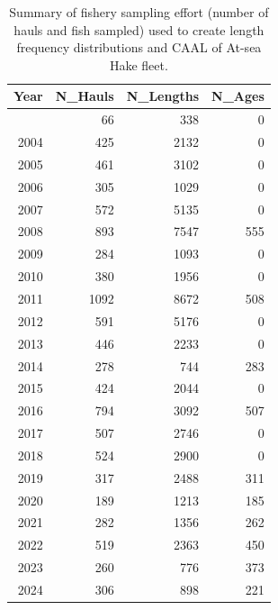 \documentclass[
]{scrartcl}
\begin{document}
\begin{longtable}{rrrr}

\caption{\label{tbl-ashop_sample_sizes}Summary of fishery sampling
effort (number of hauls and fish sampled) used to create length
frequency distributions and CAAL of At-sea Hake fleet.}

\tabularnewline

\toprule
Year & N\_Hauls & N\_Lengths & N\_Ages \\ 
\midrule\addlinespace[2.5pt]
2003 & 66 & 338 & 0 \\ 
2004 & 425 & 2132 & 0 \\ 
2005 & 461 & 3102 & 0 \\ 
2006 & 305 & 1029 & 0 \\ 
2007 & 572 & 5135 & 0 \\ 
2008 & 893 & 7547 & 555 \\ 
2009 & 284 & 1093 & 0 \\ 
2010 & 380 & 1956 & 0 \\ 
2011 & 1092 & 8672 & 508 \\ 
2012 & 591 & 5176 & 0 \\ 
2013 & 446 & 2233 & 0 \\ 
2014 & 278 & 744 & 283 \\ 
2015 & 424 & 2044 & 0 \\ 
2016 & 794 & 3092 & 507 \\ 
2017 & 507 & 2746 & 0 \\ 
2018 & 524 & 2900 & 0 \\ 
2019 & 317 & 2488 & 311 \\ 
2020 & 189 & 1213 & 185 \\ 
2021 & 282 & 1356 & 262 \\ 
2022 & 519 & 2363 & 450 \\ 
2023 & 260 & 776 & 373 \\ 
2024 & 306 & 898 & 221 \\ 
\bottomrule

\end{longtable}

\endgroup

\newpage{}

\begingroup
\fontsize{9.0pt}{10.8pt}\selectfont
\end{document}
